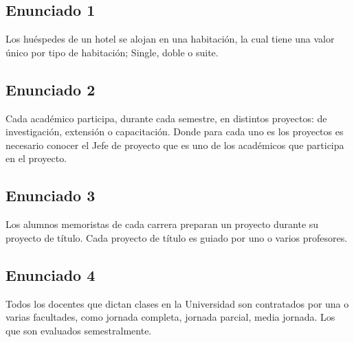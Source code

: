 \documentclass{templateNote}
\begin{document}
\subsection{Enunciado 1}
\indent
Los huéspedes de un hotel se alojan en una habitación, la cual tiene una valor único por tipo de
habitación; Single, doble o suite.


\newpage
\subsection{Enunciado 2}
\indent
Cada académico participa, durante cada semestre, en distintos proyectos: de investigación,
extensión o capacitación. Donde para cada uno es los proyectos es necesario conocer el Jefe de
proyecto que es uno de los académicos que participa en el proyecto.


\newpage
\subsection{Enunciado 3}
\indent
Los alumnos memoristas de cada carrera preparan un proyecto durante su proyecto de título.
Cada proyecto de título es guiado por uno o varios profesores.


\subsection{Enunciado 4}
\indent
Todos los docentes que dictan clases en la Universidad son contratados por una o varias
facultades, como jornada completa, jornada parcial, media jornada. Los que son evaluados
semestralmente.


\newpage
\end{document}
